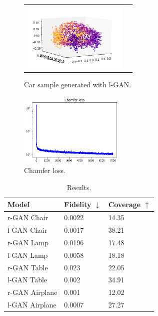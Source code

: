 \documentclass[12pt]{article}
\begin{document}
    \begin{figure}
        \centering
        \begin{tabular}{cc}
            \includegraphics[width = 50mm]{car-lgan}
        \end{tabular}
        \caption{Car sample generated with l-GAN.}
        \label{figure:car_sampled_with_lGAN}
    \end{figure}


    \begin{figure}
        \centering
        \includegraphics[width = 50mm]{chamfer-loss}
        \caption{Chamfer loss.}
        \label{figure:chamfer_loss}
    \end{figure}


    \begin{table}[H]
        \caption{Results.}
        \centering
        \begin{tabular}{lll}
            \toprule
            Model          & Fidelity $\downarrow$ & Coverage $\uparrow$ \\
            \midrule
            r-GAN Chair    & 0.0022                & 14.35               \\
            l-GAN Chair    & 0.0017                & 38.21               \\
            \midrule
            r-GAN Lamp     & 0.0196                & 17.48               \\
            l-GAN Lamp     & 0.0058                & 18.18               \\
            \midrule
            r-GAN Table    & 0.023                 & 22.05               \\
            l-GAN Table    & 0.002                 & 34.91               \\
            \midrule
            r-GAN Airplane & 0.001                 & 12.02               \\
            l-GAN Airplane & 0.0007                & 27.27               \\
            \bottomrule
        \end{tabular}
        \label{table:results}
    \end{table}
\end{document}
